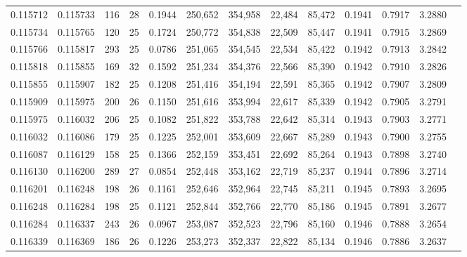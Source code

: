 \begin{tabular}{rrrrrrrrrrrrr}
0.115712 & 0.115733 & 116 &  28 &                                     0.1944 & 250,652 & 354,958 &  22,484 &  85,472 & 0.1941 & 0.7917 & 3.2880 \\
0.115734 & 0.115765 & 120 &  25 &                                     0.1724 & 250,772 & 354,838 &  22,509 &  85,447 & 0.1941 & 0.7915 & 3.2869 \\
0.115766 & 0.115817 & 293 &  25 &                                     0.0786 & 251,065 & 354,545 &  22,534 &  85,422 & 0.1942 & 0.7913 & 3.2842 \\
0.115818 & 0.115855 & 169 &  32 &                                     0.1592 & 251,234 & 354,376 &  22,566 &  85,390 & 0.1942 & 0.7910 & 3.2826 \\
0.115855 & 0.115907 & 182 &  25 &                                     0.1208 & 251,416 & 354,194 &  22,591 &  85,365 & 0.1942 & 0.7907 & 3.2809 \\
0.115909 & 0.115975 & 200 &  26 &                                     0.1150 & 251,616 & 353,994 &  22,617 &  85,339 & 0.1942 & 0.7905 & 3.2791 \\
0.115975 & 0.116032 & 206 &  25 &                                     0.1082 & 251,822 & 353,788 &  22,642 &  85,314 & 0.1943 & 0.7903 & 3.2771 \\
0.116032 & 0.116086 & 179 &  25 &                                     0.1225 & 252,001 & 353,609 &  22,667 &  85,289 & 0.1943 & 0.7900 & 3.2755 \\
0.116087 & 0.116129 & 158 &  25 &                                     0.1366 & 252,159 & 353,451 &  22,692 &  85,264 & 0.1943 & 0.7898 & 3.2740 \\
0.116130 & 0.116200 & 289 &  27 &                                     0.0854 & 252,448 & 353,162 &  22,719 &  85,237 & 0.1944 & 0.7896 & 3.2714 \\
0.116201 & 0.116248 & 198 &  26 &                                     0.1161 & 252,646 & 352,964 &  22,745 &  85,211 & 0.1945 & 0.7893 & 3.2695 \\
0.116248 & 0.116284 & 198 &  25 &                                     0.1121 & 252,844 & 352,766 &  22,770 &  85,186 & 0.1945 & 0.7891 & 3.2677 \\
0.116284 & 0.116337 & 243 &  26 &                                     0.0967 & 253,087 & 352,523 &  22,796 &  85,160 & 0.1946 & 0.7888 & 3.2654 \\
0.116339 & 0.116369 & 186 &  26 &                                     0.1226 & 253,273 & 352,337 &  22,822 &  85,134 & 0.1946 & 0.7886 & 3.2637 \\

\end{tabular}
